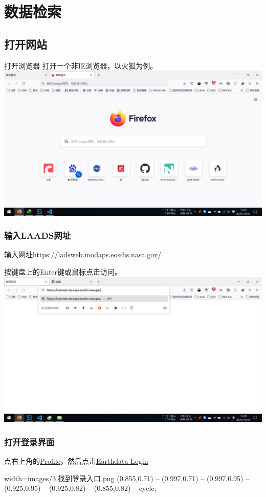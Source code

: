 \section{数据检索}
\subsection{打开网站}
\begin{frame}{打开浏览器}
    打开一个非IE浏览器，以火狐为例。
    \includegraphics[width=\linewidth]{images/1.打开浏览器.png}
\end{frame}
\begin{frame}
    \frametitle{输入LAADS网址}
    输入网址\url{https://ladsweb.modaps.eosdis.nasa.gov/}

    按键盘上的Enter键或鼠标点击访问。
    \includegraphics[width=\linewidth]{images/2.输入LAADS网址.png}
\end{frame}
\begin{frame}
    \frametitle{打开登录界面}
    点右上角的\uline{Profile}，然后点击\uline{Earthdata Login}
    \begin{annotationimage}{width=\linewidth}{images/3.找到登录入口.png}
         (0.855,0.71) -- (0.997,0.71) -- (0.997,0.95) --(0.925,0.95) -- (0.925,0.82) -- (0.855,0.82) -- cycle;
    \end{annotationimage}
\end{frame}
